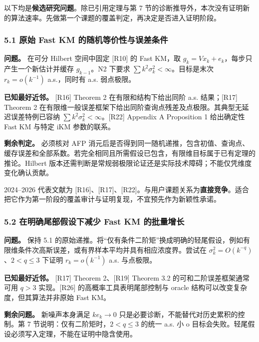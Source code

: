 \documentclass[
  chinese,
  10pt,
  a4paper,
]{article}
\begin{document}
以下均是\textbf{候选研究问题}。除已引用定理与第 7
节的诊断推导外，本次没有证明新的算法速率。先做第一个课题的覆盖判定，再决定是否进入证明阶段。

\subsubsection{5.1 原始 Fast KM
的随机等价性与误差条件}\label{ux539fux59cb-fast-km-ux7684ux968fux673aux7b49ux4ef7ux6027ux4e0eux8befux5deeux6761ux4ef6}

\textbf{问题。} 在可分 Hilbert 空间中固定 {[}R10{]} 的 Fast KM，取
\(g_k=Vx_k+e_k\)，每步只产生一个新估计并缓存 \(g_{k-1}\)。N2 下要求
\(\sum k^2\sigma_k^2<\infty\)。目标是末次 \(r_k=o(k^{-1})\) a.s.，同时有
a.s. 弱点极限。

\textbf{已知最好近邻。} {[}R16{]} Theorem 2 在有限和结构下给出同阶 a.s.
结果；{[}R17{]} Theorem 2
在有限维一般误差框架下给出同阶查询点残差及点极限。其典型无延迟误差特例已容纳
\(\sum k^2\sigma_k^2<\infty\)。{[}R22{]} Appendix A Proposition 1
给出确定性 Fast KM 与特定 iKM 参数的联系。

\textbf{剩余判定。} 必须核对 AFP
消元后是否得到同一随机递推，包含初值、查询点、缓存误差和全部系数。若完全相同且所需假设已包含，有限维目标属于已有定理的推论。Hilbert
版本还需判断是常规弱极限论证还是实际技术障碍；不能仅凭维度变化确认贡献。

2024--2026 代表文献为
{[}R16{]}、{[}R17{]}、{[}R22{]}。与用户课题关系为\textbf{直接竞争}。适合把它作为第一阶段的覆盖审计与证明复现，不宜预先作为新颖性承诺。

\subsubsection{5.2 在明确尾部假设下减少 Fast KM
的批量增长}\label{ux5728ux660eux786eux5c3eux90e8ux5047ux8bbeux4e0bux51cfux5c11-fast-km-ux7684ux6279ux91cfux589eux957f}

\textbf{问题。} 保持 5.1
的原始递推。将``仅有条件二阶矩''换成明确的轻尾假设，例如有限维条件次高斯误差，或有界样本平均并具有相应浓度界。尝试在
\(\sigma_k^2=O(k^{-q})\)、\(2<q\le3\) 下证明 \(r_k=o(k^{-1})\) a.s.
与点极限。

\textbf{已知最好近邻。} {[}R17{]} Theorem 2、{[}R19{]} Theorem 3.2
的可和二阶误差框架通常可用 \(q>3\) 实现。{[}R26{]}
的高概率工具表明尾部控制与 oracle 结构可以改变复杂度，但其算法并非原始
Fast KM。

\textbf{剩余问题。} 新噪声本身满足 \(k e_k\to0\)
只是必要诊断，不能替代对历史累积的控制。第 7
节说明：仅有二阶矩时，\(2<q\le3\) 的统一 a.s. 小 o
目标会失败。轻尾假设必须写入定理，不能在证明中隐含使用。
\end{document}
